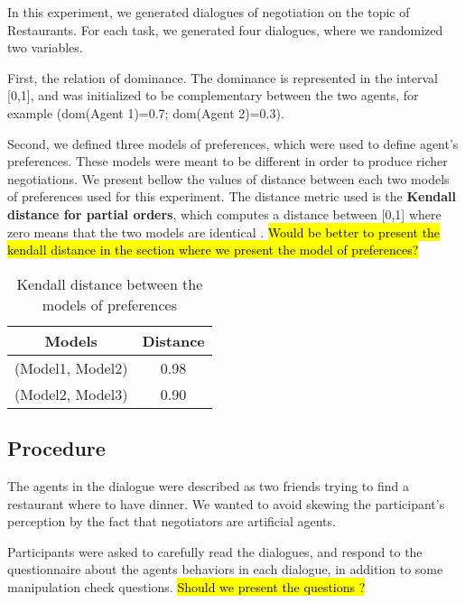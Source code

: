\documentclass{article}
\begin{document}
				In this experiment, we generated dialogues of negotiation on the topic of Restaurants. For each task, we generated four dialogues, where we randomized two variables. 
				
				First, the relation of dominance. The dominance is represented in the interval [0,1], and was initialized to be complementary between the two agents, for example (dom(Agent 1)=0.7; dom(Agent 2)=0.3). 
				
				Second, we defined three models of preferences, which were used to define agent's preferences. These models were meant to be different in order to produce richer negotiations. We present bellow the values of distance between each two models of preferences used for this experiment. The distance metric used is the \textbf{Kendall distance for partial orders}, which computes a distance between [0,1] where zero means that the two models are identical \cite{bra2013Kendall}. \hl{Would be better to present the kendall distance in the section where we present the model of preferences?}
				\begin{table} 
					\centering
					\begin{tabular}{|c|c|}
						\hline
						Models & Distance \\
						\hline
						(Model1, Model2) & 0.98\\
						(Model2, Model3) & 0.90 \\
						\hline
					\end{tabular}
					\caption{Kendall distance between the models of preferences}
				\end{table}
				

			\subsection{Procedure}
			The agents in the dialogue were described as two friends trying to find a restaurant where to have dinner. We wanted to avoid skewing the participant's perception by the fact that negotiators are artificial agents. 
			
			Participants were asked to carefully read the dialogues, and respond to the questionnaire about the agents behaviors in each dialogue, in addition to some manipulation check questions.
			\hl{Should we present the questions ?}
			

			
			
\vskip 4pt


	
\end{document}

